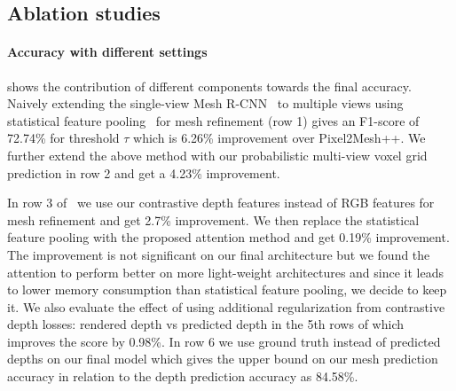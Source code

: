 \subsection{Ablation studies}


\paragraph{Accuracy with different settings}
 shows the contribution of different components towards the final accuracy. Naively extending the single-view Mesh R-CNN~\cite{gkioxari2019meshrcnn} to multiple views using statistical feature pooling~\cite{wen2019pixel2mesh++} for mesh refinement (row 1) gives an F1-score of 72.74\% for threshold $\tau$ which is 6.26\% improvement over Pixel2Mesh++.
We further extend the above method with our probabilistic multi-view voxel grid prediction in row 2 and get a 4.23\% improvement.

In row 3 of~ we use our contrastive depth features instead of RGB features for mesh refinement and get 2.7\% improvement.
We then replace the statistical feature pooling with the proposed attention method and get 0.19\% improvement.
The improvement is not significant on our final architecture but we found the attention to perform better on more light-weight architectures and since it leads to lower memory consumption than statistical feature pooling, we decide to keep it.
We also evaluate the effect of using additional regularization from contrastive depth losses: rendered depth vs predicted depth in the 5th rows of which improves the score by 0.98\%.
In row 6 we use ground truth instead of predicted depths on our final model which gives the upper bound on our mesh prediction accuracy in relation to the depth prediction accuracy as 84.58\%.


